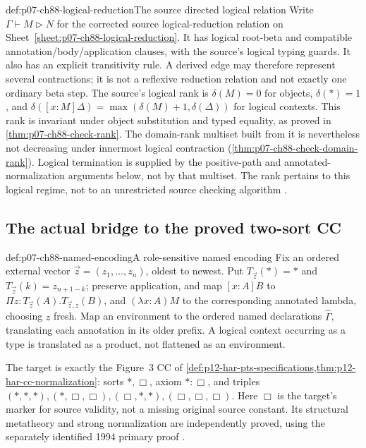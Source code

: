\begin{hbdefinition}{def:p07-ch88-logical-reduction}{The source directed logical relation}
Write \(\Gamma\vdash M\mathrel{\triangleright}N\) for the corrected
source logical-reduction relation on
Sheet~\ref{sheet:p07-ch88-logical-reduction}. It has logical root-beta
and compatible annotation/body/application clauses, with the source's
logical typing guards. It also has an explicit transitivity rule.
A derived edge may therefore represent several contractions; it is
not a reflexive reduction relation and not exactly one ordinary beta step.
The source's logical rank is
\(\delta(M)=0\) for objects, \(\delta(\ast)=1\), and
\(\delta([x:M]\Delta)=\max(\delta(M)+1,\delta(\Delta))\)
for logical contexts. This rank is invariant under object substitution
and typed equality, as proved in \cref{thm:p07-ch88-check-rank}.
The domain-rank multiset built from it is nevertheless not decreasing
under innermost logical contraction
(\cref{thm:p07-ch88-check-domain-rank}). Logical termination is supplied
by the positive-path and annotated-normalization arguments below,
not by that multiset. The rank pertains to this logical regime,
not to an unrestricted source checking algorithm
\cite[pp.~104--105]{CoquandHuet1988}.
\end{hbdefinition}



\subsection{The actual bridge to the proved two-sort CC}

\begin{hbdefinition}{def:p07-ch88-named-encoding}{A role-sensitive named encoding}
Fix an ordered external vector \(\vec z=(z_1,\ldots,z_n)\), oldest
to newest. Put \(T_{\vec z}(\ast)=\ast\) and
\(T_{\vec z}(k)=z_{n+1-k}\); preserve application, and map
\([x:A]B\) to \(\Pi z:T_{\vec z}(A).T_{\vec z,z}(B)\),
and \((\lambda x:A)M\) to the corresponding annotated lambda,
choosing \(z\) fresh. Map an environment to the ordered named
declarations \(\widehat\Gamma\), translating each annotation in
its older prefix. A logical context occurring as a type is translated
as a product, not flattened as an environment.

The target is exactly the Figure~3 CC of
\cref{def:p12-har-pts-specifications,thm:p12-har-cc-normalization}:
sorts \(\ast,\Box\), axiom \(\ast:\Box\), and triples
\((\ast,\ast,\ast),(\ast,\Box,\Box),
(\Box,\ast,\ast),(\Box,\Box,\Box)\).
Here \(\Box\) is the target's marker for source validity, not a
missing original source constant. Its structural metatheory and
strong normalization are independently proved, using the separately
identified 1994 primary proof
\cite[\S\S2--3]{Geuvers1994Report9450}.
\end{hbdefinition}

